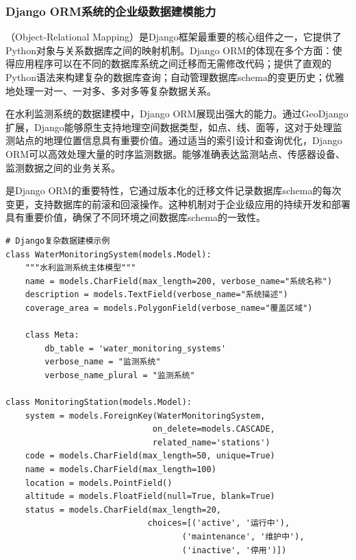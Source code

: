\hypertarget{django-ormux7cfbux7edfux7684ux4f01ux4e1aux7ea7ux6570ux636eux5efaux6a21ux80fdux529b}{%
\subsubsection{Django ORM系统的企业级数据建模能力}\label{django-ormux7cfbux7edfux7684ux4f01ux4e1aux7ea7ux6570ux636eux5efaux6a21ux80fdux529b}}

（Object-Relational Mapping）是Django框架最重要的核心组件之一，它提供了Python对象与关系数据库之间的映射机制。Django ORM的体现在多个方面：使得应用程序可以在不同的数据库系统之间迁移而无需修改代码；提供了直观的Python语法来构建复杂的数据库查询；自动管理数据库schema的变更历史；优雅地处理一对一、一对多、多对多等复杂数据关系。

在水利监测系统的数据建模中，Django ORM展现出强大的能力。通过GeoDjango扩展，Django能够原生支持地理空间数据类型，如点、线、面等，这对于处理监测站点的地理位置信息具有重要价值。通过适当的索引设计和查询优化，Django ORM可以高效处理大量的时序监测数据。能够准确表达监测站点、传感器设备、监测数据之间的业务关系。

是Django ORM的重要特性，它通过版本化的迁移文件记录数据库schema的每次变更，支持数据库的前滚和回滚操作。这种机制对于企业级应用的持续开发和部署具有重要价值，确保了不同环境之间数据库schema的一致性。

\begin{lstlisting}[style=python]
# Django复杂数据建模示例
class WaterMonitoringSystem(models.Model):
    """水利监测系统主体模型"""
    name = models.CharField(max_length=200, verbose_name="系统名称")
    description = models.TextField(verbose_name="系统描述")
    coverage_area = models.PolygonField(verbose_name="覆盖区域")
    
    class Meta:
        db_table = 'water_monitoring_systems'
        verbose_name = "监测系统"
        verbose_name_plural = "监测系统"

class MonitoringStation(models.Model):
    system = models.ForeignKey(WaterMonitoringSystem, 
                              on_delete=models.CASCADE,
                              related_name='stations')
    code = models.CharField(max_length=50, unique=True)
    name = models.CharField(max_length=100)
    location = models.PointField()
    altitude = models.FloatField(null=True, blank=True)
    status = models.CharField(max_length=20, 
                             choices=[('active', '运行中'), 
                                    ('maintenance', '维护中'),
                                    ('inactive', '停用')])
\end{lstlisting}

